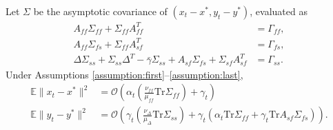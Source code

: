 \begin{theorem}\label{thm:mse}
    Let $\Sigma$ be the asymptotic covariance of $(x_t - x^*, y_t - y^*)$, evaluated as
    \begin{align*}
        A_{ff} \Sigma_{ff} + \Sigma_{ff} A_{ff}^T &= \Gamma_{ff} , \\
        A_{ff} \Sigma_{fs} + \Sigma_{ff} A_{sf}^T &= \Gamma_{fs} , \\ 
        \Delta \Sigma_{ss} + \Sigma_{ss} \Delta^T - \bar{\gamma} \Sigma_{ss} + A_{sf} \Sigma_{fs} + \Sigma_{sf} A_{sf}^T &= \Gamma_{ss} .
    \end{align*}
    Under Assumptions \ref{assumption:first}--\ref{assumption:last},
    \begin{align*}
        \mathbb{E} \lVert x_t - x^*\rVert^2 &= \mathcal{O}\left( \alpha_t \left(\frac{\nu_{ff}}{\mu_{ff}} \mathrm{Tr} \Sigma_{ff} \right) 
        + \gamma_t\right) \\
        \mathbb{E} \lVert y_t - y^* \rVert^2 &= 
        \mathcal{O}\left(\gamma_t \left(\frac{\nu_\Delta}{\mu_\Delta}  \mathrm{Tr} \Sigma_{ss} \right) + 
         \gamma_t \left(\alpha_t \mathrm{Tr} \Sigma_{ff} + \gamma_t \mathrm{Tr} A_{sf} \Sigma_{fs} \right)\right)  .
    \end{align*}
\end{theorem}


